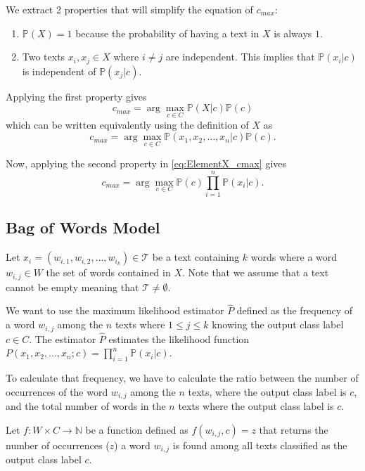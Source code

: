 \documentclass{article}
\begin{document}
We extract 2 properties that will simplify the equation of $c_{max}$:
\begin{enumerate}
	\item $\mathbb{P}(X) = 1$ because the probability of having a text in $X$ is always $1$.
	\item Two texts $x_i, x_j \in X$ where $i \neq j$ are independent. This implies that $\mathbb{P}(x_i | c)$ is independent of $\mathbb{P}(x_j | c)$.
\end{enumerate}

Applying the first property gives
\begin{equation}
	c_{max} = \arg\max_{c \in C} \mathbb{P}(X | c)\mathbb{P}(c)
\end{equation}
which can be written equivalently using the definition of $X$ as
\begin{equation} \label{eq:ElementX_cmax}
c_{max} = \arg\max_{c \in C} \mathbb{P}(x_1, x_2, \ldots, x_n | c)\mathbb{P}(c).
\end{equation}

Now, applying the second property in \eqref{eq:ElementX_cmax} gives
\begin{equation}
	c_{max} = \arg\max_{c \in C} \mathbb{P}(c) \prod\limits_{i = 1}^n \mathbb{P}(x_i | c).
\end{equation}


\subsection{Bag of Words Model}
Let $x_i = (w_{i,1}, w_{i,2}, \ldots, w_{i_k}) \in \mathcal{T}$ be a text containing $k$ words where a word $w_{i,j} \in W$ the set of words contained in $X$. Note that we assume that a text cannot be empty meaning that $\mathcal{T} \neq \emptyset$.

We want to use the maximum likelihood estimator $\widehat{P}$ defined as the frequency of a word $w_{i,j}$ among the $n$ texts where $1 \leq j \leq k$ knowing the output class label $c \in C$. The estimator $\widehat{P}$ estimates the likelihood function $P(x_1,x_2,\ldots,x_n ; c) = \prod\limits_{i=1}^n \mathbb{P}(x_i | c)$.

To calculate that frequency, we have to calculate the ratio between the number of occurrences of the word $w_{i,j}$ among the $n$ texts, where the output class label is $c$, and the total number of words in the $n$ texts where the output class label is $c$.

Let $f : W \times C \longrightarrow \mathbb{N}$ be a function defined as $f(w_{i,j}, c) = z$ that returns the number of occurrences ($z$) a word $w_{i,j}$ is found among all texts classified as the output class label $c$.
\end{document}
